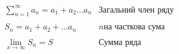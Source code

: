 
$$
\begin{array}{rl}
  \sum^\infty_{n=1} a_n = a_1+a_2 \ldots a_n & {\text{Загальний член ряду}} \\
  \\
  S_n = a_1 + a_2 + \ldots a_n & {\text{$n$на часткова сума}} \\
  \\
  \lim_{x \to \infty}  S_n = S & {\text{Сумма ряда}}
\end{array}
$$
